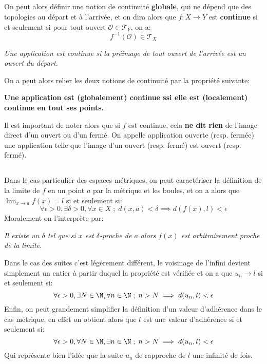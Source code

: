 \subsection*{}
On peut alors définir une notion de continuité \textbf{globale}, qui ne dépend que des topologies au départ et à l'arrivée, et on dira alors que \(f: X \longrightarrow Y\) est \textbf{continue} si et seulement si pour tout ouvert \(\mathcal{O} \in \mathcal{T}_Y\), on a:
\[
   f^{-1}(\mathcal{O}) \in \mathcal{T}_X  
\]
\begin{center}
   \textit{Une application est continue si la préimage de tout ouvert de l'arrivée est un ouvert du départ.}
\end{center}
On a peut alors relier les deux notions de continuité par la propriété suivante:
\begin{center}
   \textbf{Une application est (globalement) continue ssi elle est (localement) continue en tout ses points.}
\end{center}
Il est important de noter alors que si \(f\) est continue, cela \textbf{ne dit rien} de l'image direct d'un ouvert ou d'un fermé. On appelle application ouverte (resp. fermée) une application telle que l'image d'un ouvert (resp. fermé) est ouvert (resp. fermé).
\subsection*{}
Dans le cas particulier des espaces métriques, on peut caractériser la définition de la limite de \(f\) en un point \(a\) par la métrique et les boules, et on a alors que \(\lim_{x \rightarrow a} f(x) = l\) si et seulement si:
\[
   \forall \epsilon > 0 , \exists \delta > 0 , \forall x \in X \; ; \; d(x, a) < \delta \implies d(f(x), l) < \epsilon
\]
Moralement on l'interprète par:
\begin{center}
   \textit{Il existe un \(\delta\) tel que si \(x\) est \(\delta\)-proche de \(a\) alors \(f(x)\) est arbitrairement proche de la limite.}
\end{center}
Dans le cas des suites c'est légérement différent, le voisinage de l'infini devient simplement un entier à partir duquel la propriété est vérifiée et on a que \(u_n \longrightarrow l\) si et seulement si:
\[
   \forall \epsilon > 0 , \exists N \in \N , \forall n \in \N \; ; \; n > N  \implies d(u_n, l) < \epsilon
\]
Enfin, on peut grandement simplifier la définition d'un valeur d'adhérence dans le cas métrique, en effet on obtient alors que \(l\) est une valeur d'adhérence si et seulement si:
\[
   \forall \epsilon > 0 , \forall N \in \N , \exists n \in \N \; ; \; n > N \implies d(u_n, l) < \epsilon
\]
Qui représente bien l'idée que la suite \(u_n\) de rapproche de \(l\) une infinité de fois.
